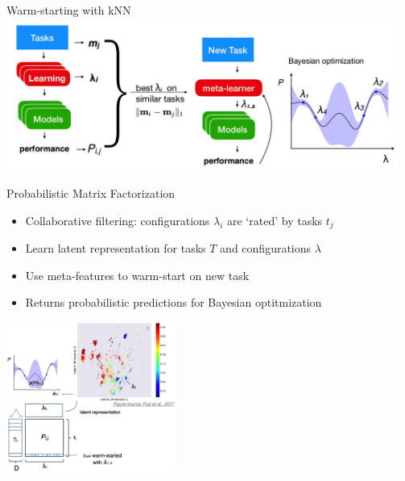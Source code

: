 \begin{frame}{Warm-starting with kNN}
    \centering\includegraphics[height=5cm]{image/img204255.jpg}
\end{frame}
\begin{frame}{Probabilistic Matrix Factorization}
    \begin{itemize}
        \item Collaborative filtering: configurations $\lambda_i$ are `rated’ by tasks  $t_j$
        \item Learn  latent representation for tasks $T$ and configurations $\lambda$
        \item Use meta-features to warm-start on new task
        \item Returns probabilistic predictions for Bayesian optitmization

    \end{itemize}
    \centering\includegraphics[height=5cm]{image/img204634.jpg}
\end{frame}

